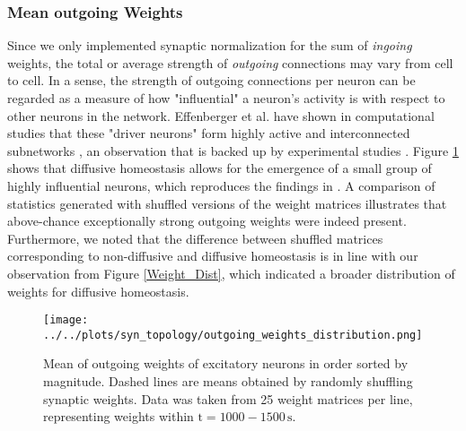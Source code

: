 \documentclass[10pt,a4paper]{article}
\begin{document}
\subsubsection{Mean outgoing Weights}\label{Section_Mean_outgoing_Weights}
Since we only implemented synaptic normalization for the sum of \emph{ingoing} weights, the total or average strength of \emph{outgoing} connections may vary from cell to cell. In a sense, the strength of outgoing connections per neuron can be regarded as a measure of how "influential" a neuron's activity is with respect to other neurons in the network. Effenberger et al. have shown in computational studies that these "driver neurons" form highly active and interconnected subnetworks \cite{Effenberger_2015}, an observation that is backed up by experimental studies \cite{Yassin_Subnetworks_2010,Eckmann_Leader_Neurons_2008}. Figure \ref{Out_Weight_Mean_Quantile} shows that diffusive homeostasis allows for the emergence of a small group of highly influential neurons, which reproduces the findings in \cite{Effenberger_2015}. A comparison of statistics generated with shuffled versions of the weight matrices illustrates that above-chance exceptionally strong outgoing weights were indeed present. Furthermore, we noted that the difference between shuffled matrices corresponding to non-diffusive and diffusive homeostasis is in line with our observation from Figure \ref{Weight_Dist}, which indicated a broader distribution of weights for diffusive homeostasis.
\begin{figure}
\texttt{[image: ../../plots/syn\_topology/outgoing\_weights\_distribution.png]}
\caption{Mean of outgoing weights of excitatory neurons in order sorted by magnitude. Dashed lines are means obtained by randomly shuffling synaptic weights. Data was taken from 25 weight matrices per line, representing weights within $\mathrm{t=1000-1500\,s}$.}
\label{Out_Weight_Mean_Quantile}
\end{figure}
\end{document}
